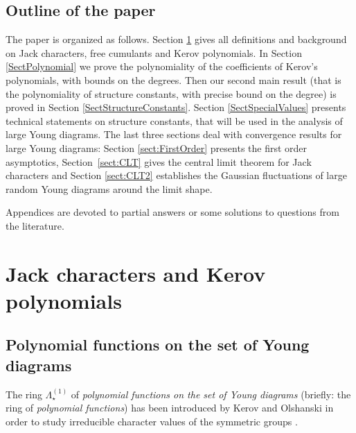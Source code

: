 \documentclass[11pt]{amsart}
\theoremstyle{plain}
\theoremstyle{remark}
\newcommand{\Polun}{\Lambda_\star^{(1)}}
\begin{document}
\subsection{Outline of the paper}
The paper is organized as follows. Section \ref{SectDefKerov} gives all
definitions and background on Jack characters, free cumulants
and Kerov polynomials.
In Section \ref{SectPolynomial} we prove the polynomiality of
the coefficients of Kerov's polynomials, with bounds on the degrees.
Then our second main result (that is the polynomiality of structure constants,
with precise bound on the degree)
is proved in Section \ref{SectStructureConstants}.
Section \ref{SectSpecialValues} presents technical statements on structure
constants, that will be used in the analysis of large Young diagrams.
The last three sections deal with convergence results for large Young diagrams:
Section \ref{sect:FirstOrder} presents the first order asymptotics, 
 Section~\ref{sect:CLT} gives the central limit theorem for Jack characters and Section \ref{sect:CLT2}
 establishes the Gaussian fluctuations of large random Young diagrams around the limit shape.

Appendices are devoted to partial answers or some solutions
to questions from the literature.


\section{Jack characters and Kerov polynomials}
\label{SectDefKerov}



\subsection{Polynomial functions on the set of Young diagrams}
\label{subsec:polfunct}
The ring $\Polun$ of \emph{polynomial functions on the set of Young diagrams}
(briefly: the ring of \emph{polynomial functions})
has been introduced by Kerov and Olshanski in order to study irreducible
character values of the symmetric groups \cite{KerovOlshanskiPolFunc}.
\end{document}
